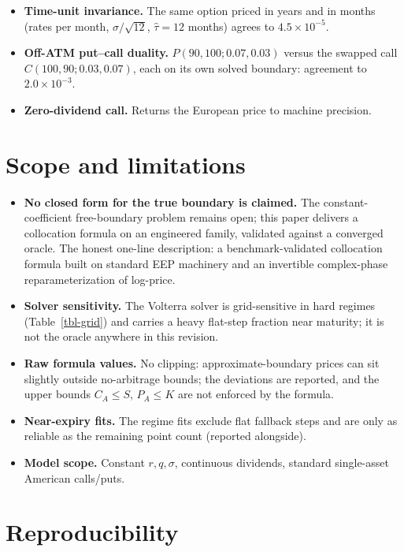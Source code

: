 \documentclass[
  english,
  10pt,
  letterpaper,
  DIV=11,
  numbers=noendperiod]{scrartcl}
\providecommand{\tightlist}{%
  \setlength{\itemsep}{0pt}\setlength{\parskip}{0pt}}
\begin{document}
\begin{itemize}
\tightlist
\item
  \textbf{Time-unit invariance.} The same option priced in years and in
  months (rates per month, \(\sigma/\sqrt{12}\), \(\hat\tau=12\) months)
  agrees to \(4.5\times10^{-5}\).
\item
  \textbf{Off-ATM put--call duality.} \(P(90,100;0.07,0.03)\) versus the
  swapped call \(C(100,90;0.03,0.07)\), each on its own solved boundary:
  agreement to \(2.0\times10^{-3}\).
\item
  \textbf{Zero-dividend call.} Returns the European price to machine
  precision.
\end{itemize}

\section{Scope and limitations}\label{sec-scope}

\begin{itemize}
\tightlist
\item
  \textbf{No closed form for the true boundary is claimed.} The
  constant-coefficient free-boundary problem remains open; this paper
  delivers a collocation formula on an engineered family, validated
  against a converged oracle. The honest one-line description: a
  benchmark-validated collocation formula built on standard EEP
  machinery and an invertible complex-phase reparameterization of
  log-price.
\item
  \textbf{Solver sensitivity.} The Volterra solver is grid-sensitive in
  hard regimes (Table~\ref{tbl-grid}) and carries a heavy flat-step
  fraction near maturity; it is not the oracle anywhere in this
  revision.
\item
  \textbf{Raw formula values.} No clipping: approximate-boundary prices
  can sit slightly outside no-arbitrage bounds; the deviations are
  reported, and the upper bounds \(C_A\le S\), \(P_A\le K\) are not
  enforced by the formula.
\item
  \textbf{Near-expiry fits.} The regime fits exclude flat fallback steps
  and are only as reliable as the remaining point count (reported
  alongside).
\item
  \textbf{Model scope.} Constant \(r,q,\sigma\), continuous dividends,
  standard single-asset American calls/puts.
\end{itemize}

\section{Reproducibility}\label{sec-repro}
\end{document}

